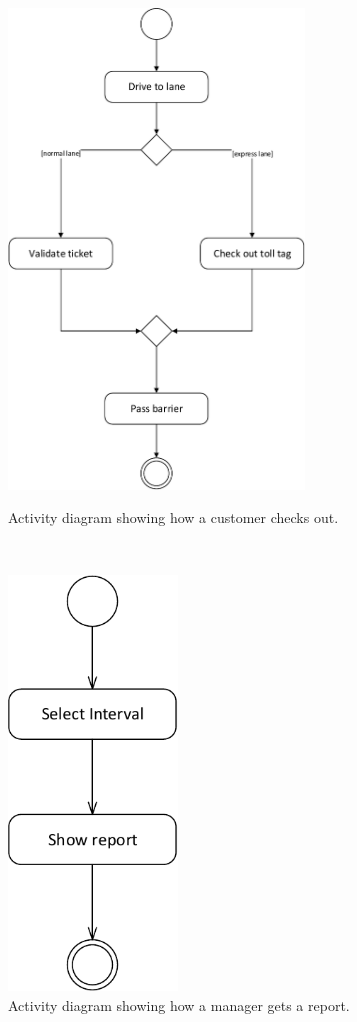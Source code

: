 \begin{figure}[H]
	\centering
	\begin{minipage}{0.4\textwidth}
	\centering
	\includegraphics[width=0.7\textwidth]{img/activity_diagram/check_out}
	\caption{Activity diagram showing how a customer checks out.}
	\end{minipage}
	~
	\begin{minipage}{0.3\textwidth}
	\centering
	\includegraphics[width=0.4\textwidth]{img/activity_diagram/show_report}
	\caption{Activity diagram showing how a manager gets a report.}
	\end{minipage}
\end{figure}